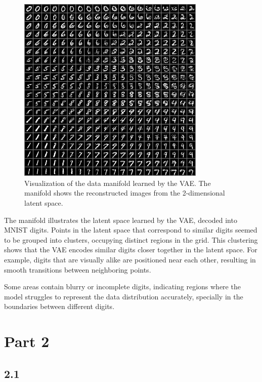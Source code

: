 \documentclass{article}
\begin{document}

\begin{figure}[H]
    \centering
    \includegraphics[width=0.8\textwidth]{images/vae_manifold.png}
    \caption{Visualization of the data manifold learned by the VAE. The manifold shows the reconstructed images from the
    2-dimensional latent space.}
    \label{fig:vae_manifold}
\end{figure}

The manifold illustrates the latent space learned by the VAE, decoded into MNIST digits. Points in the latent space that correspond to similar digits seemed to be grouped into clusters, occupying distinct regions in the grid. This clustering shows that the VAE encodes similar digits closer together in the latent space. For example, digits that are visually alike are positioned near each other, resulting in smooth transitions between neighboring points.

Some areas contain blurry or incomplete digits, indicating regions where the model struggles to represent the data distribution accurately, specially in the boundaries between different digits.


\newpage
\section*{Part 2}

\subsection*{2.1}
\end{document}
